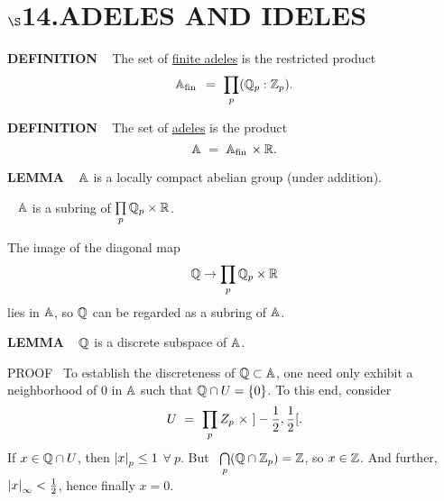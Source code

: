 \chapter{
$\boldsymbol{\S}$\textbf{14}.\quad  ADELES AND IDELES}
\setlength\parindent{2em}
\setcounter{theoremn}{0}

\begin{x}{\small\bf DEFINITION} \ %
The set of 
\underline{finite adeles}
is the restricted product
\[
\mathbb{A}_{\text{fin}\hspace{0.05cm}} \ = \ \prod\limits_p (\mathbb{Q}_p: \mathbb{Z}_p).
\]
\end{x}

\vspace{0.1cm}

\begin{x}{\small\bf DEFINITION} \ %
The set of 
\underline{adeles}
is the product
\[
\mathbb{A} \ = \ \mathbb{A}_{\text{fin}\hspace{0.05cm}} \times \mathbb{R}.
\]
\end{x}

\vspace{0.1cm}

\begin{x}{\small\bf LEMMA} \ %
$\mathbb{A}$ is a locally compact abelian group (under addition).
\end{x}

\vspace{0.1cm}

\begin{x}{\small\bf {}} \ %
$\mathbb{A}$ is a subring of \quad $\prod\limits_p \mathbb{Q}_p \times \mathbb{R}$.
\end{x}

\vspace{0.1cm}



The image of the diagonal map
\[
\mathbb{Q} \rightarrow \prod\limits_p \mathbb{Q}_p \times \mathbb{R}
\]
lies in $\mathbb{A}$, so $\mathbb{Q}$ can be regarded as a subring of $\mathbb{A}$.

\vspace{0.1cm}


\begin{x}{\small\bf LEMMA} \ %
$\mathbb{Q}$ is a discrete subspace of $\mathbb{A}$.

\vspace{0.1cm}

PROOF \ 
To establish the discreteness of $\mathbb{Q} \subset \mathbb{A}$, one need only exhibit a neighborhood \mU of 0 in $\mathbb{A}$ such that $\mathbb{Q} \cap U = \{0\}$.  
To this end, consider
\[
U \ = \  \prod\limits_p \\ Z_p \ \times \  ] -\frac{1}{2},\frac{1}{2}[.
\]
If $x \in \mathbb{Q} \cap U$, then $\left\vert x\right\vert_p \le 1$ $\forall \ p$.  
But \ $\bigcap\limits_p (\mathbb{Q} \cap \mathbb{Z}_p) = \mathbb{Z}$, so $x \in \mathbb{Z}$.  
And further, $\left\vert x\right\vert_{\infty} < \frac{1}{2}$, hence finally $x = 0$.
\end{x}

